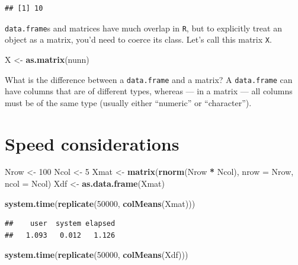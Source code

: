 \documentclass[]{book}
\newenvironment{Shaded}{\begin{snugshade}}{\end{snugshade}}
\newcommand{\DataTypeTok}[1]{\textcolor[rgb]{0.13,0.29,0.53}{#1}}
\newcommand{\DecValTok}[1]{\textcolor[rgb]{0.00,0.00,0.81}{#1}}
\newcommand{\KeywordTok}[1]{\textcolor[rgb]{0.13,0.29,0.53}{\textbf{#1}}}
\newcommand{\NormalTok}[1]{#1}
\newcommand{\OperatorTok}[1]{\textcolor[rgb]{0.81,0.36,0.00}{\textbf{#1}}}
\newcommand{\StringTok}[1]{\textcolor[rgb]{0.31,0.60,0.02}{#1}}
\theoremstyle{definition}
\theoremstyle{definition}
\theoremstyle{definition}
\theoremstyle{remark}
\begin{document}
\begin{verbatim}
## [1] 10
\end{verbatim}

\texttt{data.frame}s and matrices have much overlap in \texttt{R}, but to explicitly treat an object as a matrix, you'd need to coerce its class. Let's call this matrix \texttt{X}.

\begin{Shaded}
\begin{Highlighting}[]
\NormalTok{X <-}\StringTok{ }\KeywordTok{as.matrix}\NormalTok{(nunn)}
\end{Highlighting}
\end{Shaded}

What is the difference between a \texttt{data.frame} and a matrix? A \texttt{data.frame} can have columns that are of different types, whereas --- in a matrix --- all columns must be of the same type (usually either ``numeric'' or ``character'').

\hypertarget{speed-considerations}{%
\section{Speed considerations}\label{speed-considerations}}

\begin{Shaded}
\begin{Highlighting}[]
\NormalTok{Nrow <-}\StringTok{ }\DecValTok{100}
\NormalTok{Ncol <-}\StringTok{ }\DecValTok{5}
\NormalTok{Xmat <-}\StringTok{ }\KeywordTok{matrix}\NormalTok{(}\KeywordTok{rnorm}\NormalTok{(Nrow }\OperatorTok{*}\StringTok{ }\NormalTok{Ncol), }\DataTypeTok{nrow =}\NormalTok{ Nrow, }\DataTypeTok{ncol =}\NormalTok{ Ncol)}
\NormalTok{Xdf <-}\StringTok{ }\KeywordTok{as.data.frame}\NormalTok{(Xmat)}

\KeywordTok{system.time}\NormalTok{(}\KeywordTok{replicate}\NormalTok{(}\DecValTok{50000}\NormalTok{, }\KeywordTok{colMeans}\NormalTok{(Xmat)))}
\end{Highlighting}
\end{Shaded}

\begin{verbatim}
##    user  system elapsed 
##   1.093   0.012   1.126
\end{verbatim}

\begin{Shaded}
\begin{Highlighting}[]
\KeywordTok{system.time}\NormalTok{(}\KeywordTok{replicate}\NormalTok{(}\DecValTok{50000}\NormalTok{, }\KeywordTok{colMeans}\NormalTok{(Xdf)))}
\end{Highlighting}
\end{Shaded}
\end{document}
